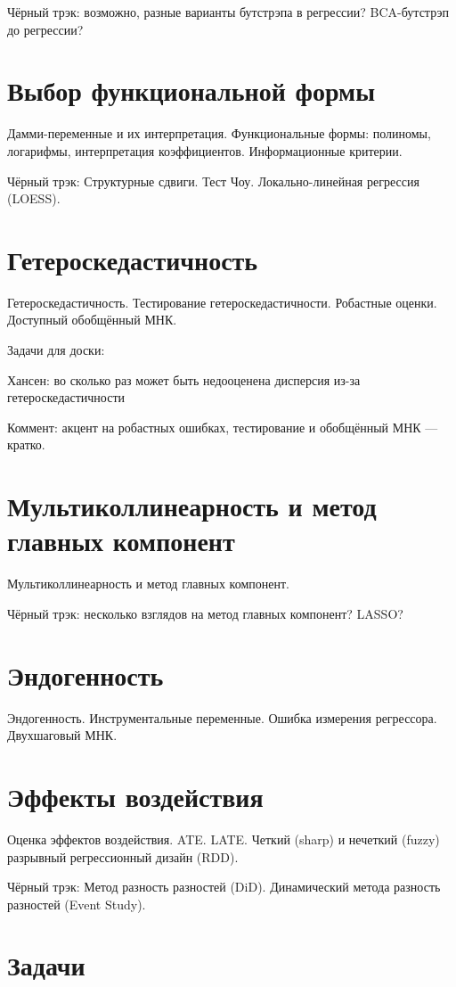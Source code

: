 \documentclass[12pt]{article}
\newcommand{\ESS}{ESS}
\begin{document}
Чёрный трэк: возможно, разные варианты бутстрэпа в регрессии? BCA-бутстрэп до регрессии?

\section{Выбор функциональной формы}
Дамми-переменные и их интерпретация. Функциональные формы: полиномы, логарифмы, интерпретация коэффициентов. Информационные критерии.

Чёрный трэк: Структурные сдвиги. Тест Чоу. Локально-линейная регрессия (LO\ESS).

\section{Гетероскедастичность}
Гетероскедастичность. Тестирование гетероскедастичности. Робастные оценки. Доступный обобщённый МНК.

Задачи для доски:

Хансен: во сколько раз может быть недооценена дисперсия из-за гетероскедастичности


Коммент: акцент на робастных ошибках, тестирование и обобщённый МНК — кратко.

\section{Мультиколлинеарность и метод главных компонент}
Мультиколлинеарность и метод главных компонент.

Чёрный трэк: несколько взглядов на метод главных компонент? LASSO?


\section{Эндогенность}
Эндогенность. Инструментальные переменные. Ошибка измерения регрессора. Двухшаговый МНК.


\section{Эффекты воздействия}
Оценка эффектов воздействия. ATE. LATE. Четкий (sharp) и нечеткий (fuzzy) разрывный регрессионный дизайн (RDD).

Чёрный трэк: Метод разность разностей (DiD). Динамический метода разность разностей (Event Study).

\section{Задачи}
\end{document}
